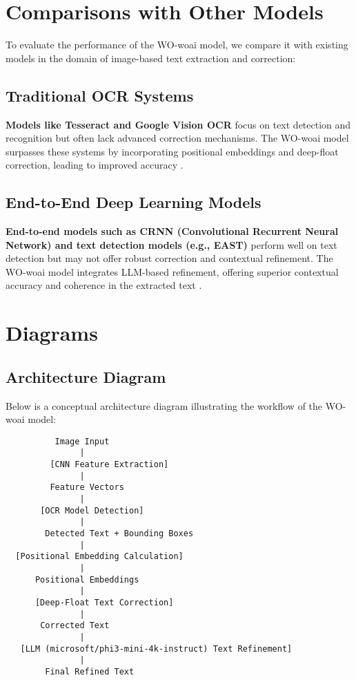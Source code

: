 \documentclass{article}
\begin{document}
\section{Comparisons with Other Models}
To evaluate the performance of the WO-woai model, we compare it with existing models in the domain of image-based text extraction and correction:

\subsection{Traditional OCR Systems}
\textbf{Models like Tesseract and Google Vision OCR} focus on text detection and recognition but often lack advanced correction mechanisms. The WO-woai model surpasses these systems by incorporating positional embeddings and deep-float correction, leading to improved accuracy \cite{Mingyang2024}.

\subsection{End-to-End Deep Learning Models}
\textbf{End-to-end models such as CRNN (Convolutional Recurrent Neural Network) and text detection models (e.g., EAST)} perform well on text detection but may not offer robust correction and contextual refinement. The WO-woai model integrates LLM-based refinement, offering superior contextual accuracy and coherence in the extracted text \cite{Zhang2024}.

\section{Diagrams}

\subsection{Architecture Diagram}
Below is a conceptual architecture diagram illustrating the workflow of the WO-woai model:

\begin{verbatim}
          Image Input
               |
         [CNN Feature Extraction]
               |
         Feature Vectors
               |
       [OCR Model Detection]
               |
        Detected Text + Bounding Boxes
               |
  [Positional Embedding Calculation]
               |
      Positional Embeddings
               |
      [Deep-Float Text Correction]
               |
       Corrected Text
               |
   [LLM (microsoft/phi3-mini-4k-instruct) Text Refinement]
               |
        Final Refined Text
\end{verbatim}
\end{document}
